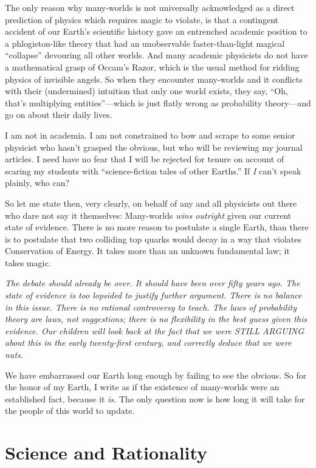 {
 The only reason why many-worlds is not universally acknowledged as
a direct prediction of physics which requires magic to violate, is that
a contingent accident of our Earth's scientific history
gave an entrenched academic position to a phlogiston-like theory that
had an unobservable faster-than-light magical
``collapse'' devouring all other
worlds. And many academic physicists do not have a mathematical grasp
of Occam's Razor, which is the usual method for ridding
physics of invisible angels. So when they encounter many-worlds and it
conflicts with their (undermined) intuition that only one world exists,
they say, ``Oh, that's multiplying
entities''---which is just flatly wrong as
probability theory---and go on about their daily lives.}

{
 I am not in academia. I am not constrained to bow and scrape to
some senior physicist who hasn't grasped the obvious,
but who will be reviewing my journal articles. I need have no fear that
I will be rejected for tenure on account of scaring my students with
``science-fiction tales of other
Earths.'' If \textit{I} can't speak
plainly, who can?}

{
 So let me state then, very clearly, on behalf of any and all
physicists out there who dare not say it themselves: Many-worlds
\textit{wins outright} given our current state of evidence. There is no
more reason to postulate a single Earth, than there is to postulate
that two colliding top quarks would decay in a way that violates
Conservation of Energy. It takes more than an unknown fundamental law;
it takes magic.}

{
 \textit{The debate should already be over. It should have been
over fifty years ago. The state of evidence is too lopsided to justify
further argument. There is no balance in this issue. There is no
rational controversy to teach. The laws of probability theory are laws,
not suggestions; there is no flexibility in the best guess given this
evidence. Our children will look back at the fact that we were STILL
ARGUING about this in the early twenty-first century, and correctly
deduce that we were nuts.}}

{
 We have embarrassed our Earth long enough by failing to see the
obvious. So for the honor of my Earth, I write as if the existence of
many-worlds were an established fact, because it \textit{is.} The only
question now is how long it will take for the people of this world to
update.}

\myendsectiontext

\chapter{Science and Rationality}

